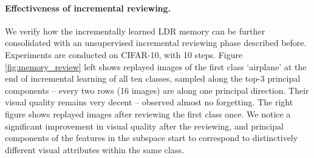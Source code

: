 \documentclass[../../book-main.tex]{subfiles}
\begin{document}


\paragraph{Effectiveness of incremental reviewing.}
We verify how the incrementally learned LDR memory can be further consolidated with an unsupervised incremental reviewing phase described before. Experiments are conducted on CIFAR-10, with 10 steps. Figure \ref{fig:memory_review} left shows replayed images of the first class `airplane' at the end of incremental learning of all ten classes, sampled along the top-3 principal components -- every two rows (16 images) are along one principal direction. Their  visual quality remains very decent -- observed almost no forgetting. The right figure shows replayed images after reviewing the first class once. We notice a significant improvement in visual quality after the reviewing, and principal components of the features in the subspace start to correspond to distinctively different visual attributes within the same class.
\end{document}
